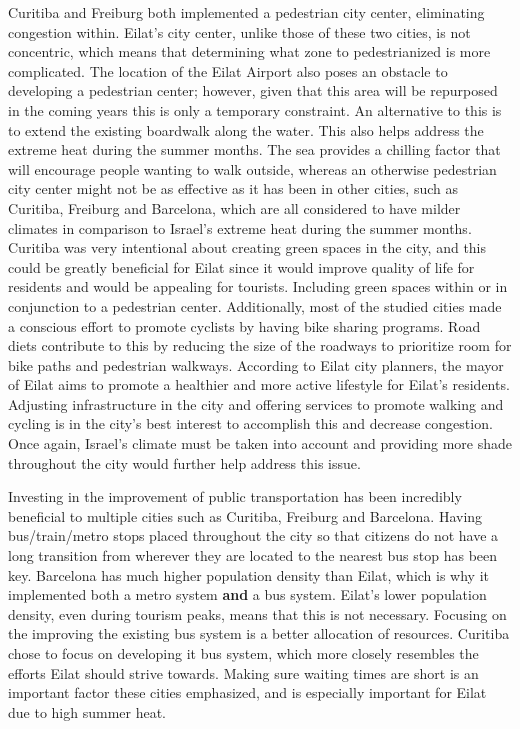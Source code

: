 \documentclass[12pt]{article}                               %
\begin{document}
Curitiba and Freiburg both implemented a pedestrian city center, eliminating congestion within. Eilat's city center, unlike those of these two cities, is not concentric, which means that determining what zone to pedestrianized is more complicated. The location of the Eilat Airport also poses an obstacle to developing a pedestrian center; however, given that this area will be repurposed in the coming years this is only a temporary constraint. An alternative to this is to extend the existing boardwalk along the water. This also helps address the extreme heat during the summer months. The sea provides a chilling factor that will encourage people wanting to walk outside, whereas an otherwise pedestrian city center might not be as effective as it has been in other cities, such as Curitiba, Freiburg and Barcelona, which are all considered to have milder climates in comparison to Israel's extreme heat during the summer months. Curitiba was very intentional about creating green spaces in the city, and this could be greatly beneficial for Eilat since it would improve quality of life for residents and would be appealing for tourists. Including green spaces within or in conjunction to a pedestrian center. Additionally, most of the studied cities made a conscious effort to promote cyclists by having bike sharing programs. Road diets contribute to this by reducing the size of the roadways to prioritize room for bike paths and pedestrian walkways. According to Eilat city planners, the mayor of Eilat aims to promote a healthier and more active lifestyle for Eilat's residents. Adjusting infrastructure in the city and offering services to promote walking and cycling is in the city's best interest to accomplish this and decrease congestion. Once again, Israel's climate must be taken into account and providing more shade throughout the city would further help address this issue. 

Investing in the improvement of public transportation has been incredibly beneficial to multiple cities such as Curitiba, Freiburg and Barcelona. Having bus/train/metro stops placed throughout the city so that citizens do not have a long transition from wherever they are located to the nearest bus stop has been key. Barcelona has much higher population density than Eilat, which is why it implemented both a metro system \textbf{and} a bus system. Eilat's lower population density, even during tourism peaks, means that this is not necessary. Focusing on the improving the existing bus system is a better allocation of resources. Curitiba chose to focus on developing it bus system, which more closely resembles the efforts Eilat should strive towards. Making sure waiting times are short is an important factor these cities emphasized, and is especially important for Eilat due to high summer heat. 
\end{document}
